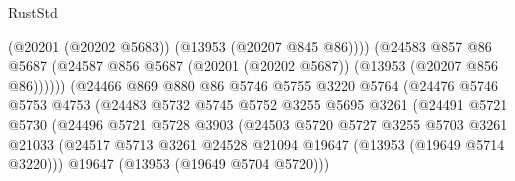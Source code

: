 \begin{lexlean}{RustStd}
\begin{coremodule}
                                          (@20201 (@20202 @5683))
                                          (@13953 (@20207 @845 @86))))
                                      (@24583
                                        @857
                                        @86
                                        @5687
                                        (@24587
                                          @856
                                          @5687
                                          (@20201 (@20202 @5687))
                                          (@13953 (@20207 @856 @86))))))
                                  (@24466
                                    @869
                                    @880
                                    @86
                                    @5746
                                    @5755
                                    @3220
                                    @5764
                                    (@24476
                                      @5746
                                      @5753
                                      @4753
                                      (@24483
                                        @5732
                                        @5745
                                        @5752
                                        @3255
                                        @5695
                                        @3261
                                        (@24491
                                          @5721
                                          @5730
                                          (@24496
                                            @5721
                                            @5728
                                            @3903
                                            (@24503
                                              @5720
                                              @5727
                                              @3255
                                              @5703
                                              @3261
                                              @21033
                                              (@24517
                                                @5713
                                                @3261
                                                @24528
                                                @21094
                                                @19647
                                                (@13953 (@19649 @5714 @3220)))
                                              @19647
                                              (@13953 (@19649 @5704 @5720)))

\end{coremodule}
\end{lexlean}
